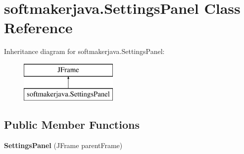 \hypertarget{classsoftmakerjava_1_1_settings_panel}{}\section{softmakerjava.\+Settings\+Panel Class Reference}
\label{classsoftmakerjava_1_1_settings_panel}
Inheritance diagram for softmakerjava.\+Settings\+Panel\+:\begin{figure}[H]
\begin{center}
\leavevmode
\includegraphics[height=2.000000cm]{classsoftmakerjava_1_1_settings_panel}
\end{center}
\end{figure}
\subsection*{Public Member Functions}
\begin{DoxyCompactItemize}
\item 
{\bfseries Settings\+Panel} (J\+Frame parent\+Frame)\hypertarget{classsoftmakerjava_1_1_settings_panel_acc09db6c0fbf482aa72d11f1832cc482}{}\label{classsoftmakerjava_1_1_settings_panel_acc09db6c0fbf482aa72d11f1832cc482}

\end{DoxyCompactItemize}

